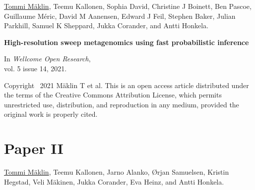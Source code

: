 \vspace{80pt}
\underline{Tommi Mäklin}, Teemu Kallonen, Sophia David, Christine J
Boinett, Ben Pascoe, Guillaume Méric, David M Aanensen, Edward J Feil,
Stephen Baker, Julian Parkhill, Samuel K Sheppard, Jukka Corander, and
Antti Honkela.

\vspace{10pt}
\noindent\textbf{High-resolution sweep metagenomics using fast probabilistic inference}

\vspace{10pt}
\noindent In
\emph{Wellcome Open Research},
\\vol. 5 issue 14, 2021.

\vspace{60pt}
\noindent Copyright \textcopyright\ 2021 Mäklin T et al. This is an
open access article distributed under the terms of the Creative
Commons Attribution License, which permits unrestricted use,
distribution, and reproduction in any medium, provided the original
work is properly cited.

\cleardoublepage
%




\chapter*{Paper II}\thispagestyle{plain}







\vspace{80pt}

\underline{Tommi Mäklin}, Teemu Kallonen, Jarno Alanko, Ørjan
Samuelsen, Kristin Hegstad, Veli Mäkinen, Jukka Corander, Eva Heinz,
and Antti Honkela.

